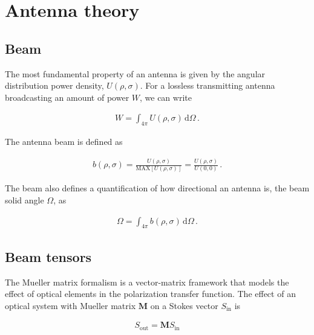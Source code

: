 \documentclass[a4paper,fleqn]{cas-dc}\sloppy
\begin{document}
	\section{Antenna theory}
	\label{sec::antennas}
	
	\subsection{Beam}
	
	The most fundamental property of an antenna is given by the angular distribution power density, $U(\rho,\sigma)$. For a lossless transmitting antenna broadcasting an amount of power $W$, we can write
	
	\begin{equation}
	\begin{aligned}
	W = \int_{4\pi} U(\rho,\sigma) \, \mathrm{d} \Omega \, .
	\end{aligned}
	\end{equation}
	
	\noindent
	The antenna beam is defined as
	
	\begin{equation}
	\begin{aligned}
	b(\rho, \sigma) = \frac{ U(\rho, \sigma) }{ \mathrm{MAX}\left[ U(\rho,\sigma) \right] }  =  \frac{ U(\rho, \sigma) }{ U(0,0) } \, .
	\end{aligned}
	\label{eq::beam_def}
	\end{equation}
	
	\noindent
	The beam also defines a quantification of how directional an antenna is, the beam solid angle $\Omega$, as
	
	\begin{equation}
	\begin{aligned}
	\Omega = \int_{4\pi} b(\rho,\sigma) \, \mathrm{d} \Omega \, .
	\end{aligned}
	\label{eq::omega_def}
	\end{equation}
	
	\subsection{Beam tensors}
	
	The Mueller matrix formalism is a vector-matrix framework that models the effect of optical elements in the polarization transfer function. The effect of an optical system with Mueller matrix $\mathbf{M}$ on a Stokes vector $S_{\mathrm{in}}$ is 
	
	\begin{equation}
	\begin{aligned}
	S_{\mathrm{out}} = \mathbf{M} S_{\mathrm{in}}
	\end{aligned}
	\end{equation}
	
\end{document}
